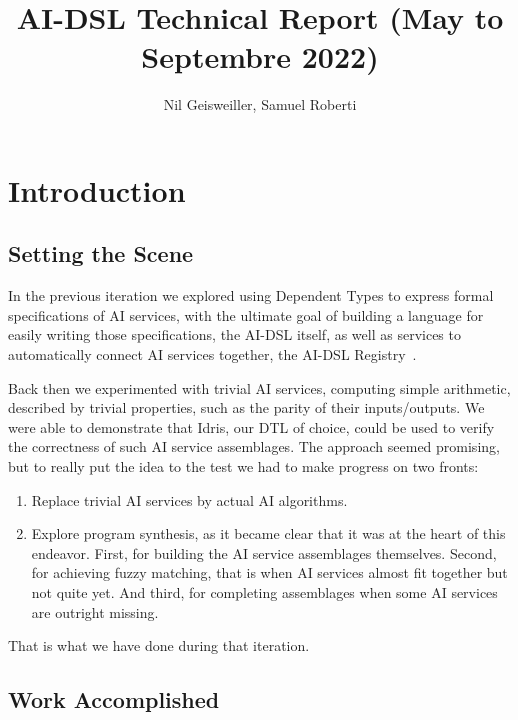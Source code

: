 \documentclass[]{report}
\begin{document}
\title{AI-DSL Technical Report (May to Septembre 2022)}
\author{Nil Geisweiller, Samuel Roberti}
\maketitle

\begin{abstract}
\end{abstract}

\tableofcontents

\chapter{Introduction}

\section{Setting the Scene}

In the previous iteration we explored using Dependent Types to express
formal specifications of AI services, with the ultimate goal of
building a language for easily writing those specifications, the
AI-DSL itself, as well as services to automatically connect AI
services together, the AI-DSL Registry~\cite{AIDSLReport2021}.

Back then we experimented with trivial AI services, computing simple
arithmetic, described by trivial properties, such as the parity of
their inputs/outputs.  We were able to demonstrate that Idris, our DTL
of choice, could be used to verify the correctness of such AI service
assemblages.  The approach seemed promising, but to really put the
idea to the test we had to make progress on two fronts:

\begin{enumerate}
\item Replace trivial AI services by actual AI algorithms.
\item Explore program synthesis, as it became clear that it was at the
  heart of this endeavor.  First, for building the AI service
  assemblages themselves.  Second, for achieving fuzzy matching, that
  is when AI services almost fit together but not quite yet.  And
  third, for completing assemblages when some AI services are outright
  missing.
\end{enumerate}
That is what we have done during that iteration.

\section{Work Accomplished}
\end{document}
